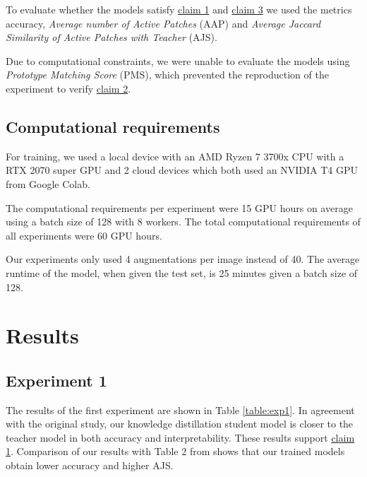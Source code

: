 To evaluate whether the models satisfy \hyperlink{claim1}{claim 1} and \hyperlink{claim3}{claim 3} we used the metrics accuracy, \textit{Average number of Active Patches} (AAP) and \textit{Average Jaccard Similarity of Active Patches with Teacher} (AJS). 

Due to computational constraints, we were unable to evaluate the models using \textit{Prototype Matching Score} (PMS), which prevented the reproduction of the experiment to verify \hyperlink{claim2}{claim 2}. 

\subsection{Computational requirements}


For training, we used a local device with an AMD Ryzen 7 3700x CPU with a RTX 2070 super GPU and 2 cloud devices which both used an NVIDIA T4 GPU from Google Colab. 


The computational requirements per experiment were 15 GPU hours on average using a batch size of 128 with 8 workers. The total computational requirements of all experiments were 60 GPU hours.

Our experiments only used 4 augmentations per image instead of 40. The average runtime of the model, when given the test set, is 25 minutes given a batch size of 128.



\section{Results}
\label{sec:results}
\subsection{Experiment 1}
The results of the first experiment are shown in Table \ref{table:exp1}. In agreement with the original study, our knowledge distillation student model is closer to the teacher model in both accuracy and interpretability. These results support \hyperlink{claim1}{claim 1}. Comparison of our results with Table 2 from \citet{keswani2022proto2proto} shows that our trained models obtain lower accuracy and higher AJS.

